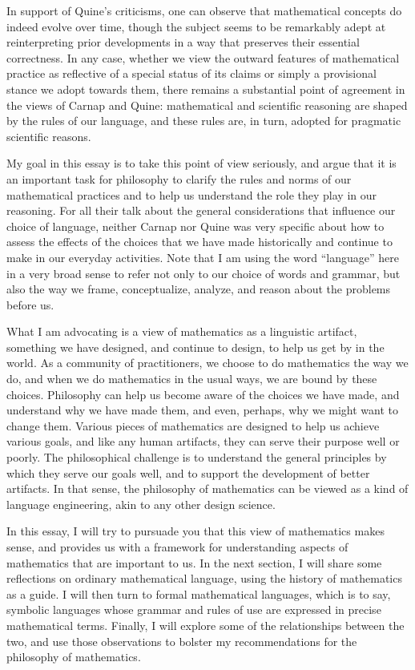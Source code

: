 \documentclass[12pt]{article}
\begin{document}
In support of Quine's criticisms, one can observe that mathematical concepts do indeed evolve over time, though the subject seems to be remarkably adept at reinterpreting prior developments in a way that preserves their essential correctness. In any case, whether we view the outward features of mathematical practice as reflective of a special status of its claims or simply a provisional stance we adopt towards them, there remains a substantial point of agreement in the views of Carnap and Quine: mathematical and scientific reasoning are shaped by the rules of our language, and these rules are, in turn, adopted for pragmatic scientific reasons.

My goal in this essay is to take this point of view seriously, and argue that it is an important task for philosophy to clarify the rules and norms of our mathematical practices and to help us understand the role they play in our reasoning. For all their talk about the general considerations that influence our choice of language, neither Carnap nor Quine was very specific about how to assess the effects of the choices that we have made historically and continue to make in our everyday activities. Note that I am using the word ``language'' here in a very broad sense to refer not only to our choice of words and grammar, but also the way we frame, conceptualize, analyze, and reason about the problems before us.

What I am advocating is a view of mathematics as a linguistic artifact, something we have designed, and continue to design, to help us get by in the world. As a community of practitioners, we choose to do mathematics the way we do, and when we do mathematics in the usual ways, we are bound by these choices. Philosophy can help us become aware of the choices we have made, and understand why we have made them, and even, perhaps, why we might want to change them. Various pieces of mathematics are designed to help us achieve various goals, and like any human artifacts, they can serve their purpose well or poorly. The philosophical challenge is to understand the general principles by which they serve our goals well, and to support the development of better artifacts. In that sense, the philosophy of mathematics can be viewed as a kind of language engineering, akin to any other design science.

In this essay, I will try to pursuade you that this view of mathematics makes sense, and provides us with a framework for understanding aspects of mathematics that are important to us. In the next section, I will share some reflections on ordinary mathematical language, using the history of mathematics as a guide. I will then turn to formal mathematical languages, which is to say, symbolic languages whose grammar and rules of use are expressed in precise mathematical terms. Finally, I will explore some of the relationships between the two, and use those observations to bolster my recommendations for the philosophy of mathematics. 
\end{document}
